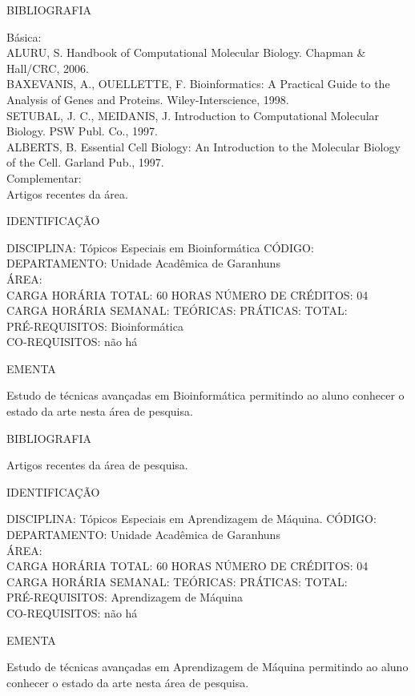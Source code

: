 \documentclass[
	12pt,				%
	openright,			%
  oneside,     %
	a4paper,			%
	english,			%
	french,				%
	spanish,			%
	brazil				%
	]{abntex2}
\begin{document}
\begin{apendicesenv}
BIBLIOGRAFIA 

Básica:\\
ALURU, S. Handbook of Computational Molecular Biology. Chapman \& Hall/CRC, 2006.\\
BAXEVANIS, A., OUELLETTE, F. Bioinformatics: A Practical Guide to the Analysis of Genes and Proteins. Wiley-Interscience, 1998.\\
SETUBAL, J. C., MEIDANIS, J. Introduction to Computational Molecular Biology. PSW Publ. Co., 1997.\\
ALBERTS, B. Essential Cell Biology: An Introduction to the Molecular Biology of the Cell. Garland Pub., 1997.\\
Complementar:\\
Artigos recentes da área.

\newpage IDENTIFICAÇÃO

DISCIPLINA: Tópicos Especiais em Bioinformática CÓDIGO:\\ 
DEPARTAMENTO: Unidade Acadêmica de Garanhuns\\
ÁREA: \\
CARGA HORÁRIA TOTAL: 60 HORAS NÚMERO DE CRÉDITOS: 04\\
CARGA HORÁRIA SEMANAL: TEÓRICAS: PRÁTICAS: TOTAL: \\
PRÉ-REQUISITOS: Bioinformática\\
CO-REQUISITOS: não há

EMENTA 

Estudo de técnicas avançadas em Bioinformática permitindo ao aluno conhecer o estado da arte nesta área de pesquisa.

BIBLIOGRAFIA 

Artigos recentes da área de pesquisa.

\newpage IDENTIFICAÇÃO

DISCIPLINA: Tópicos Especiais em Aprendizagem de Máquina. CÓDIGO:\\ 
DEPARTAMENTO: Unidade Acadêmica de Garanhuns\\ 
ÁREA: \\
CARGA HORÁRIA TOTAL: 60 HORAS NÚMERO DE CRÉDITOS: 04\\
CARGA HORÁRIA SEMANAL: TEÓRICAS: PRÁTICAS: TOTAL: \\
PRÉ-REQUISITOS: Aprendizagem de Máquina\\
CO-REQUISITOS: não há

EMENTA 

Estudo de técnicas avançadas em Aprendizagem de Máquina permitindo ao
aluno conhecer o estado da arte nesta área de pesquisa.


\end{apendicesenv}
\end{document}
